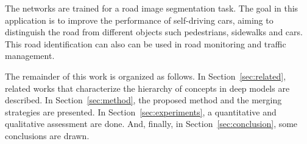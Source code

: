 
The networks are trained for a road image segmentation task. The goal in this application is to improve the performance of self-driving cars, aiming to distinguish the road from different objects such pedestrians, sidewalks and cars. This road identification can also can be used in road monitoring and traffic management.

The remainder of this work is organized as follows. In Section~\ref{sec:related}, related works that characterize the hierarchy of concepts in deep models are described. In Section~\ref{sec:method}, the proposed method and the merging strategies are presented. In Section~\ref{sec:experiments}, a quantitative and qualitative assessment are done. And, finally, in Section~\ref{sec:conclusion}, some conclusions are drawn.
